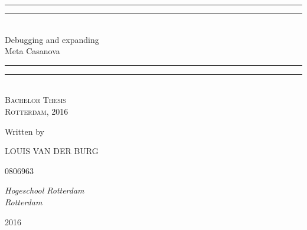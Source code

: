 \newcommand*{\titleGP}{\begingroup %
\centering %
\vspace*{\baselineskip} %

\rule{\textwidth}{1.6pt}\vspace*{-\baselineskip}\vspace*{2pt} %
\rule{\textwidth}{0.4pt}\\[0.5\baselineskip] %

{\LARGE Debugging and expanding \\ [0.4\baselineskip] Meta Casanova }\\[0.2\baselineskip] %

\rule{\textwidth}{0.4pt}\vspace*{-\baselineskip}\vspace{3.2pt} %
\rule{\textwidth}{1.6pt}\\[\baselineskip] %

\scshape %
Bachelor Thesis\\[\baselineskip] %
Rotterdam, 2016\par %

\vspace*{3\baselineskip} %

Written by \\[0.3\baselineskip]
{\Large LOUIS VAN DER BURG \par} %
{\small 0806963 } \\[0.3\baselineskip] %
{\itshape Hogeschool Rotterdam \\ Rotterdam\par} %

\vspace*{1.5\baselineskip} %

\vfill %

{\scshape 2016} \\[0.3\baselineskip] %

\endgroup}


%


\titleGP %

%
